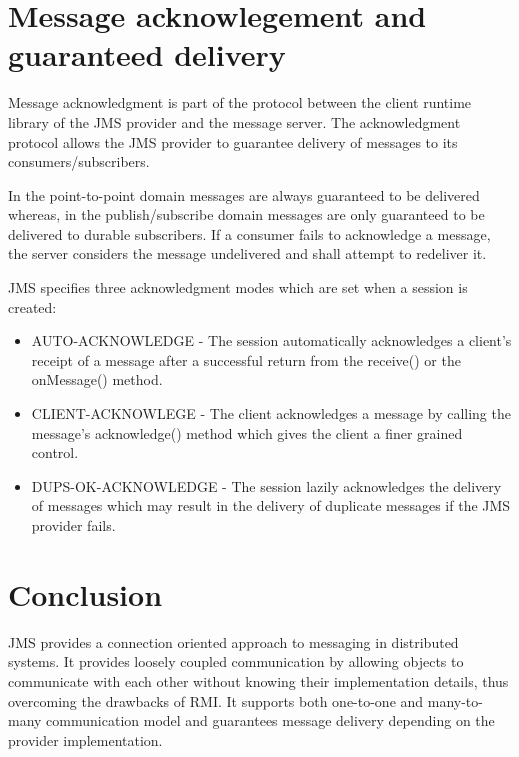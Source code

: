 \documentclass[9pt,twocolumn,twoside]{styles/osajnl}
\begin{document}
\section{Message acknowlegement and guaranteed delivery}


Message acknowledgment is part of the protocol between the client
runtime library of the JMS provider and the message server. \cite{www-jms-fischli-article} The
acknowledgment protocol allows the JMS provider to guarantee delivery
of messages to its consumers/subscribers.

In the point-to-point domain messages are always guaranteed to be
delivered whereas, in the publish/subscribe domain messages are only
guaranteed to be delivered to durable subscribers.  If a consumer
fails to acknowledge a message, the server considers the message
undelivered and shall attempt to redeliver it.

JMS specifies three acknowledgment modes which are set when a session
is created:
\begin{itemize}
\item AUTO-ACKNOWLEDGE - The session automatically acknowledges
a client's receipt of a message after a successful return from the
receive() or the onMessage() method.
\item CLIENT-ACKNOWLEGE - The client
acknowledges a message by calling the message's acknowledge() method
which gives the client a finer grained control.
\item DUPS-OK-ACKNOWLEDGE -
The session lazily acknowledges the delivery of messages which may
result in the delivery of duplicate messages if the JMS provider fails.
\cite{www-jms-fischli-article}
\end{itemize}


\section{Conclusion}
JMS provides a connection oriented approach to messaging in
distributed systems. It provides loosely coupled communication by
allowing objects to communicate with each other without knowing their
implementation details, thus overcoming the drawbacks of RMI. It
supports both one-to-one and many-to-many communication model and
guarantees message delivery depending on the provider implementation.




\end{document}
